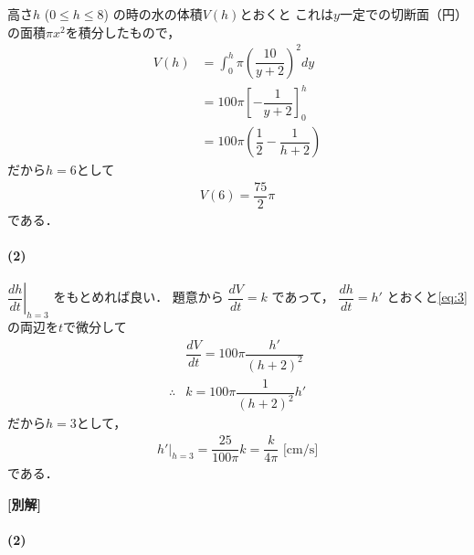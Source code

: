 \documentclass[../../main.tex]{subfiles}
\begin{document}
高さ$h$ ($0 \le h \le 8$) の時の水の体積$V(h)$とおくと
これは$y$一定での切断面（円）の面積$\pi x^2$を積分したもので，
\begin{align}
  V(h) &= \int_0^h \pi \left( \dfrac{10}{y+2} \right)^2 dy \\
  &= 100\pi \left[ -\dfrac{1}{y+2} \right]_0^h \\
  &= 100\pi \left( \dfrac{1}{2} - \dfrac{1}{h+2} \right) \label{eq:3}
\end{align}
だから$h=6$として
\begin{align}
  V(6) = \dfrac{75}{2}\pi
\end{align}
である．

\paragraph{(2)}

$\left. \dfrac{dh}{dt} \right|_{h=3}$ をもとめれば良い．
題意から $\dfrac{dV}{dt} = k$ であって，
$\dfrac{dh}{dt} = h'$ とおくと\cref{eq:3}の両辺を$t$で微分して
\begin{align}
  & \dfrac{dV}{dt} = 100\pi\dfrac{h'}{(h+2)^2} \\
  \therefore
  &  k = 100\pi \dfrac{1}{(h+2)^2} h'
\end{align}
だから$h=3$として，
\begin{align}
  \left. h' \right|_{h=3} = \dfrac{25}{100\pi}k = \dfrac{k}{4\pi} \text{ [cm/s]}
\end{align}
である．

{\bf [別解]}

\paragraph{(2)}
\end{document}
